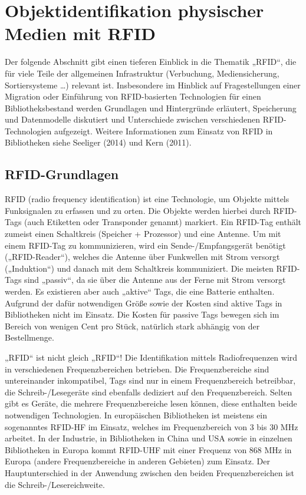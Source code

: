\documentclass[
  11pt,
  letterpaper,
  DIV=11,
  twoside]{scrreprt}
\begin{document}
\section{Objektidentifikation physischer Medien mit RFID}\label{rfid}

Der folgende Abschnitt gibt einen tieferen Einblick in die Thematik
„RFID``, die für viele Teile der allgemeinen Infrastruktur (Verbuchung,
Mediensicherung, Sortiersysteme \ldots) relevant ist. Insbesondere im
Hinblick auf Fragestellungen einer Migration oder Einführung von
RFID-basierten Technologien für einen Bibliotheksbestand werden
Grundlagen und Hintergründe erläutert, Speicherung und Datenmodelle
diskutiert und Unterschiede zwischen verschiedenen RFID-Technologien
aufgezeigt. Weitere Informationen zum Einsatz von RFID in Bibliotheken
siehe Seeliger (2014) und Kern (2011).

\subsection{RFID-Grundlagen}\label{rfid-grundlagen}

RFID (radio frequency identification) ist eine Technologie, um Objekte
mittels Funksignalen zu erfassen und zu orten. Die Objekte werden
hierbei durch RFID-Tags (auch Etiketten oder Transponder genannt)
markiert. Ein RFID-Tag enthält zumeist einen Schaltkreis (Speicher +
Prozessor) und eine Antenne. Um mit einem RFID-Tag zu kommunizieren,
wird ein Sende-/Empfangsgerät benötigt („RFID-Reader``), welches die
Antenne über Funkwellen mit Strom versorgt („Induktion``) und danach mit
dem Schaltkreis kommuniziert. Die meisten RFID-Tags sind „passiv``, da
sie über die Antenne aus der Ferne mit Strom versorgt werden. Es
existieren aber auch „aktive`` Tags, die eine Batterie enthalten.
Aufgrund der dafür notwendigen Größe sowie der Kosten sind aktive Tags
in Bibliotheken nicht im Einsatz. Die Kosten für passive Tags bewegen
sich im Bereich von wenigen Cent pro Stück, natürlich stark abhängig von
der Bestellmenge.

„RFID`` ist nicht gleich „RFID``! Die Identifikation mittels
Radiofrequenzen wird in verschiedenen Frequenzbereichen betrieben. Die
Frequenzbereiche sind untereinander inkompatibel, Tags sind nur in einem
Frequenzbereich betreibbar, die Schreib-/Lesegeräte sind ebenfalls
dediziert auf den Frequenzbereich. Selten gibt es Geräte, die mehrere
Frequenzbereiche lesen können, diese enthalten beide notwendigen
Technologien. In europäischen Bibliotheken ist meistens ein sogenanntes
RFID-HF im Einsatz, welches im Frequenzbereich von 3 bis 30 MHz
arbeitet. In der Industrie, in Bibliotheken in China und USA sowie in
einzelnen Bibliotheken in Europa kommt RFID-UHF mit einer Frequenz von
868 MHz in Europa (andere Frequenzbereiche in anderen Gebieten) zum
Einsatz. Der Hauptunterschied in der Anwendung zwischen den beiden
Frequenzbereichen ist die Schreib-/Lesereichweite.
\end{document}
